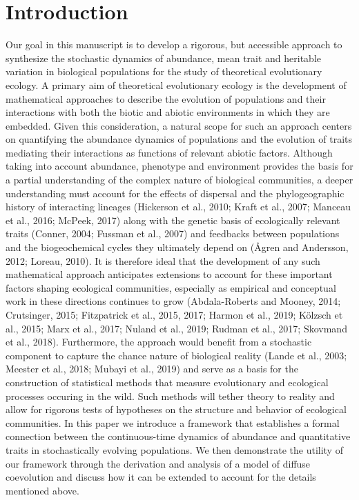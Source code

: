 \documentclass[]{elsarticle} %
\begin{document}
\hypertarget{introduction}{%
\section{Introduction}\label{introduction}}

Our goal in this manuscript is to develop a rigorous, but accessible
approach to synthesize the stochastic dynamics of abundance, mean trait
and heritable variation in biological populations for the study of
theoretical evolutionary ecology. A primary aim of theoretical
evolutionary ecology is the development of mathematical approaches to
describe the evolution of populations and their interactions with both
the biotic and abiotic environments in which they are embedded. Given
this consideration, a natural scope for such an approach centers on
quantifying the abundance dynamics of populations and the evolution of
traits mediating their interactions as functions of relevant abiotic
factors. Although taking into account abundance, phenotype and
environment provides the basis for a partial understanding of the
complex nature of biological communities, a deeper understanding must
account for the effects of dispersal and the phylogeographic history of
interacting lineages (Hickerson et al., 2010; Kraft et al., 2007;
Manceau et al., 2016; McPeek, 2017) along with the genetic basis of
ecologically relevant traits (Conner, 2004; Fussman et al., 2007) and
feedbacks between populations and the biogeochemical cycles they
ultimately depend on (Ågren and Andersson, 2012; Loreau, 2010). It is
therefore ideal that the development of any such mathematical approach
anticipates extensions to account for these important factors shaping
ecological communities, especially as empirical and conceptual work in
these directions continues to grow (Abdala-Roberts and Mooney, 2014;
Crutsinger, 2015; Fitzpatrick et al., 2015, 2017; Harmon et al., 2019;
Kölzsch et al., 2015; Marx et al., 2017; Nuland et al., 2019; Rudman et
al., 2017; Skovmand et al., 2018). Furthermore, the approach would
benefit from a stochastic component to capture the chance nature of
biological reality (Lande et al., 2003; Meester et al., 2018; Mubayi et
al., 2019) and serve as a basis for the construction of statistical
methods that measure evolutionary and ecological processes occuring in
the wild. Such methods will tether theory to reality and allow for
rigorous tests of hypotheses on the structure and behavior of ecological
communities. In this paper we introduce a framework that establishes a
formal connection between the continuous-time dynamics of abundance and
quantitative traits in stochastically evolving populations. We then
demonstrate the utility of our framework through the derivation and
analysis of a model of diffuse coevolution and discuss how it can be
extended to account for the details mentioned above.
\end{document}
